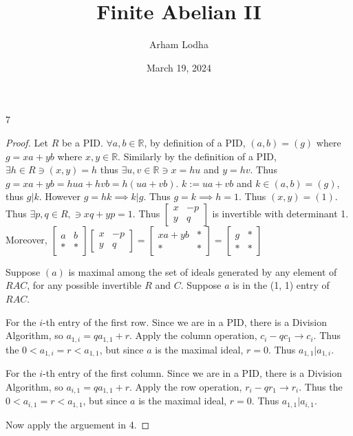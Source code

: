 \documentclass{article}
\newcommand{\R}{\mathbb{R}}
\begin{document}
\title{Finite Abelian II}
\author{Arham Lodha}%
\date{March 19, 2024}%
\maketitle

\begin{PROB}{7}\label{Problem 7.}
\end{PROB}
\begin{proof}
    Let $R$ be a PID. $\forall a, b \in \R$, by definition of a PID, $(a, b) = (g)$ where $g = xa + yb$ where $x, y \in \R$. Similarly by the definition of a PID, $\exists h \in R \ni (x, y) = h$ thus $\exists u, v \in \R \ni x = hu$ and $y = hv$. Thus $g = xa + yb = hua + hvb = h(ua + vb)$. $k:= ua + vb$ and $k \in (a, b) = (g)$, thus $g | k$. However $g = hk \implies k | g$. Thus $g = k \implies h = 1$. Thus $(x, y) = (1)$. Thus $\exists p, q \in R, \ni xq + yp = 1$. Thus $\begin{bmatrix}
        x & -p \\ y & q
    \end{bmatrix}$ is invertible with determinant 1. Moreover, $\begin{bmatrix}
        a & b \\ * & *
    \end{bmatrix} \begin{bmatrix}
        x & -p \\ y & q 
    \end{bmatrix} = \begin{bmatrix}
        xa + yb & * \\ * & *
    \end{bmatrix} = \begin{bmatrix}
        g & * \\ * & *
    \end{bmatrix}$
    
    
    Suppose $(a)$ is maximal among the set of ideals generated by any element of $RAC$, for any possible invertible $R$ and $C$. Suppose $a$ is in the (1, 1) entry of $RAC$. 

    For the $i$-th  entry of the first row. Since we are in a PID, there is a Division Algorithm, so $a_{1, i} = qa_{1, 1} + r$. Apply the column operation, $c_{i}-qc_{1} \to c_{i}$. Thus the $0 < a_{1, i} = r < a_{1, 1}$, but since $a$ is the maximal ideal, $r = 0$. Thus $a_{1, 1} | a_{1, i}$. 
    
    For the $i$-th  entry of the first column. Since we are in a PID, there is a Division Algorithm, so $a_{i, 1} = qa_{1, 1} + r$. Apply the row operation, $r_{i}-qr_{1} \to r_{i}$. Thus the $0 < a_{i, 1} = r < a_{1, 1}$, but since $a$ is the maximal ideal, $r = 0$. Thus $a_{1, 1} | a_{i, 1}$. 

    Now apply the arguement in 4. 
\end{proof}
\end{document}
